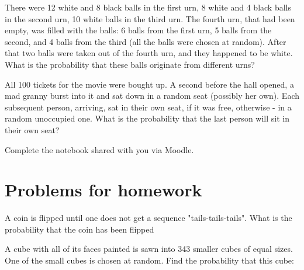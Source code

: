 \documentclass[14pt]{exam}
\begin{document}
\begin{questions}
		
		\question
		There were 12 white and 8 black balls in the first urn, 8 white and 4 black balls in the second urn, 10 white balls in the third urn. The fourth urn, that had been empty, was filled with the balls: 6 balls from the first urn, 5 balls from the second, and 4 balls from the third (all the balls were chosen at random). After that two balls were taken out of the fourth urn, and they happened to be white. What is the probability that these balls originate from different urns?







		\question
		All 100 tickets for the movie were bought up. A second before the hall opened, a mad granny burst into it and sat down in a random seat (possibly her own). Each subsequent person, arriving, sat in their own seat, if it was free, otherwise - in a random unoccupied one. What is the probability that the last person will sit in their own seat?
		





	
		\question
		Complete the notebook shared with you via Moodle.
		
		
		
		
	
	
	
		\section*{Problems for homework}
		\question
		A coin is flipped until one does not get a sequence "tails-tails-tails". What is the probability that the coin has been flipped
		
		




		
		\question
		A cube with all of its faces painted is sawn into 343 smaller cubes of equal sizes. One of the small cubes is chosen at random. Find the probability that this cube:
		

\end{questions}
\end{document}
